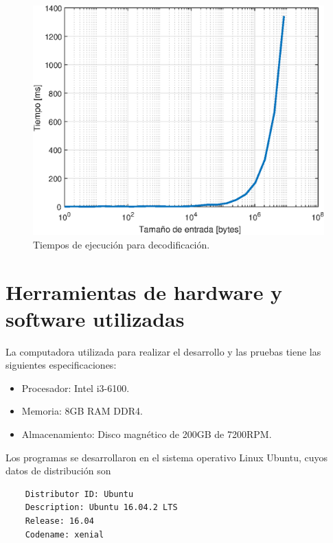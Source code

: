 \begin{figure}[h]
	\centering
	\includegraphics[scale=1]{includes/decodingTimes.eps}
	\caption{Tiempos de ejecución para decodificación.}
	\label{decodeTime}
\end{figure}

\clearpage

\section{Herramientas de hardware y software utilizadas}\label{sec_tools}

La computadora utilizada para realizar el desarrollo y las pruebas tiene las siguientes especificaciones:
\begin{itemize}
	\item Procesador: Intel i3-6100.
	\item Memoria: 8GB RAM DDR4.
	\item Almacenamiento: Disco magnético de 200GB de 7200RPM.
\end{itemize}

Los programas se desarrollaron en el sistema operativo Linux Ubuntu, cuyos datos de distribución son 
\begin{Verbatim}
	Distributor ID: Ubuntu
	Description: Ubuntu 16.04.2 LTS
	Release: 16.04
	Codename: xenial
\end{Verbatim}

